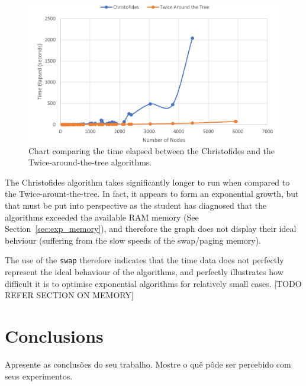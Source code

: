 \documentclass[12pt]{article}
\begin{document}
\begin{figure}[ht]
\centering
\includegraphics[height=.325\textheight]{execution_time_comparison.png}
\caption{Chart comparing the time elapsed between the Christofides and the Twice-around-the-tree algorithms.}
\label{fig:exec_time}
\end{figure}

The Christofides algorithm takes significantly longer to run when compared to the Twice-arount-the-tree. 
In fact, it appears to form an exponential growth, but that must be put into perspective as the student 
has diagnosed that the algorithms exceeded the available RAM memory (See Section~\ref{sec:exp_memory}), and therefore 
the graph does not display their ideal behviour (suffering from the slow speeds of the swap/paging memory).

The use of the \texttt{swap} therefore indicates that the time data does not perfectly represent the ideal behaviour 
of the algorithms, and perfectly illustrates how difficult it is to optimise exponential algorithms for relatively 
small cases. [TODO REFER SECTION ON MEMORY]

\section{Conclusions} \label{sec:conclusions}
    Apresente as conclusões do seu trabalho. Mostre o quê pôde ser percebido
    com seus experimentos.



\end{document}
